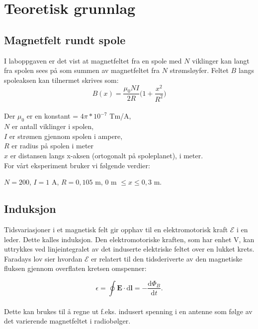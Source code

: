 \documentclass[12pt,norsk,a4paper]{article}
\begin{document}
\section{Teoretisk grunnlag}

\subsection{Magnetfelt rundt spole}
I laboppgaven er det vist at magnetfeltet fra en spole med $N$ viklinger kan langt fra spolen sees på som summen av magnetfeltet fra $N$ strømsløyfer. Feltet $B$ langs spoleaksen kan tilnermet skrives som:\\


\begin{equation}
    \label{eq:magnetfelt-spole}
    B(x) = \frac{\mu_0 N I}{2R} \Bigg(1 + \frac{x^2}{R^2} \Bigg) 
\end{equation}
\\
Der $\mu_0$ er en konstant = $4\pi * 10^{-7} $ Tm/A, \\
$N$ er antall viklinger i spolen,\\
$I$ er strømen gjennom spolen i ampere,\\
$R$ er radius på spolen i meter\\
$x$ er distansen langs x-aksen (ortogonalt på spoleplanet), i meter.\\
For vårt eksperiment bruker vi følgende verdier:\\

\begin{center}
$N = 200$, $I = 1$ A, \hspace{1cm}$R = 0,105$ m, \hspace{1cm} 0 m $\le x \le 0,3$ m.
\end{center}

\subsection{Induksjon}
Tidsvariasjoner i et magnetisk felt gir opphav til en elektromotorisk kraft $\mathcal{E}$ i en leder. Dette kalles induksjon. Den elektromotoriske kraften, som har enhet V, kan uttrykkes ved linjeintegralet av det induserte elektriske feltet over en lukket krets. Faradays lov sier hvordan $\mathcal{E}$ er relatert til den tidsderiverte av den magnetiske fluksen gjennom overflaten kretsen omspenner:

\begin{equation}
\epsilon = \oint \textbf{E} \cdot \textrm{d}\textbf{l} = - \frac{\textrm{d}\Phi_B}{\textrm{d}t}.
\end{equation}
\\
Dette kan brukes til å regne ut f.eks. indusert spenning i en antenne som følge av det varierende magnetfeltet i radiobølger.
\end{document}
